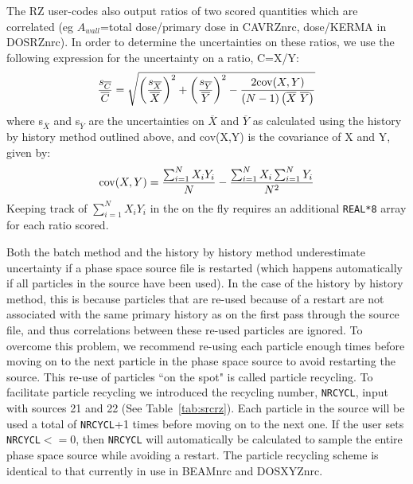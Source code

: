 \documentclass[12pt,twoside]{article}  %
\begin{document}
The RZ user-codes also output ratios of two scored quantities
which are correlated (eg $A_{wall}$=total dose/primary dose in CAVRZnrc,
dose/KERMA in DOSRZnrc).  In order to determine the uncertainties on these
ratios, we use the following expression for the uncertainty on a 
ratio, C=X/Y:
\begin{equation}
\frac{s_{\overline{C}}}{\overline{C}} =
\sqrt{\left({\frac{s_{\overline{X}}}{\overline{X}}}\right)^2 +
\left({\frac{s_{\overline{Y}}}{\overline{Y}}}\right)^2 - \frac{2{\rm cov}(X,Y)}
{\left(N-1\right)\left(\overline{X}~\overline{Y}\right)}} 
\end{equation}
where s$_{\overline{X}}$ and s$_{\overline{Y}}$ are the uncertainties on
$\overline{X}$ and $\overline{Y}$ as calculated using the history by
history method outlined above, and cov(X,Y) is the covariance of X and Y, given by:
\begin{equation}
{\rm cov}(X,Y)=\frac{\sum_{i=1}^{N}X_iY_i}{N}-\frac{\sum_{i=1}^{N}X_i\sum_{i=1}^{N}Y_i}{N^2}
\label{coveq}
\end{equation}
Keeping track of $\sum_{i=1}^{N}X_iY_i$ in the  on the fly 
requires an additional {\tt REAL*8} array for each ratio scored.

Both the batch method and the history by history method underestimate
uncertainty if a phase space source file is restarted (which happens
automatically if all particles in the source have been used).  In the
case of the history by history method, this is because particles
that are re-used because of a restart are not associated with the
same primary history as on the first pass through the source file,
and thus correlations between these re-used particles are ignored.
To overcome this problem, we recommend re-using each particle enough
times before moving on to the next particle in the phase space source to
avoid restarting the source.  This re-use of particles ``on the spot"
is called particle recycling.  To facilitate particle recycling we
introduced the recycling number, {\tt NRCYCL}, input with sources 21
and 22 (See Table~\ref{tab:srcrz}).  Each particle in the source will be
used a total of {\tt NRCYCL}+1 times before moving on to the next one.
If the user sets {\tt NRCYCL}$<=$0, then {\tt NRCYCL} will automatically
be calculated to sample the entire phase space source while avoiding
a restart.  The particle recycling scheme is identical to that currently
in use in BEAMnrc and DOSXYZnrc.
\end{document}
